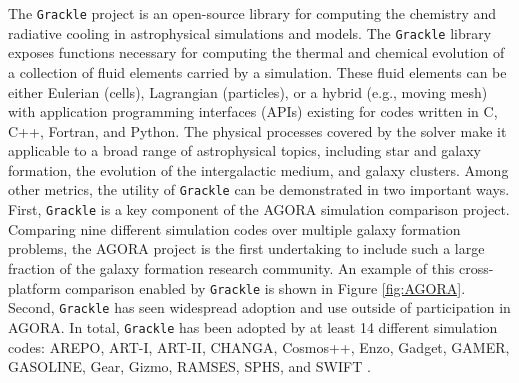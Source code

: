 \documentclass[11pt]{article}
\newcommand{\grackle}{\texttt{Grackle}}
\begin{document}
\begin{flushleft}
The \grackle{} project
\citep[][\url{https://grackle.readthedocs.io}]{2017MNRAS.466.2217S} is
an open-source library for computing the chemistry and radiative
cooling in astrophysical simulations and models.  The
\grackle{} library exposes functions necessary for computing the
thermal and chemical evolution of a collection of fluid elements carried by a
simulation.  These fluid elements can be either Eulerian (cells),
Lagrangian (particles), or a hybrid (e.g., moving mesh) with
application programming interfaces (APIs)
existing for codes written in C, C++, Fortran, and Python.  The
physical processes covered by the solver make it applicable to a broad
range of astrophysical topics, including star and galaxy formation, the
evolution of the intergalactic medium, and galaxy clusters.  Among
other metrics, the utility of \grackle{} can be demonstrated in two
important ways.  First, \grackle{} is a key component of the AGORA
\citep{2014ApJS..210...14K, 2016ApJ...833..202K} simulation comparison
project.  Comparing nine different simulation codes over multiple
galaxy formation problems, the AGORA project is the first
undertaking to include such a large fraction of the galaxy formation research
community.  An example of this cross-platform comparison enabled by
\grackle{} is shown in Figure \ref{fig:AGORA}.  Second, \grackle{} has
seen widespread adoption and use outside of participation in AGORA.
In total, \grackle{} has been adopted by at least 14 different
simulation codes:
AREPO, ART-I, ART-II, CHANGA, Cosmos++, Enzo, Gadget, GAMER, GASOLINE, Gear,
Gizmo, RAMSES, SPHS, and SWIFT
\citep{2010MNRAS.401..791S, 1999PhDT........25K, 2002ApJ...571..563K,
2008ApJ...672...19R, 2004NewA....9..137W, 2006MNRAS.373.1074S,
2003ApJS..147..177A, 2005ApJ...635..723A, 2014ApJS..211...19B,
2005MNRAS.364.1105S, 2010ApJS..186..457S, 2004NewA....9..137W,
2012A&A...538A..82R, 2012ASPC..453..141R, 2015MNRAS.450...53H,
2002A&A...385..337T, 2012MNRAS.422.3037R, 2013arXiv1309.3783G,
2016arXiv160602738S}.


\end{flushleft}
\end{document}
